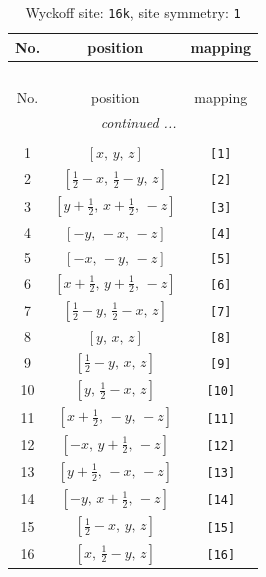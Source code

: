 \documentclass[fleqn,8pt]{jsarticle}
\begin{document}
\begin{longtable}{ccc}
\caption{Wyckoff site: {\tt 16k}, site symmetry: {\tt 1}}
 \\
 \hline \hline
No. & position & mapping \\ \hline \endfirsthead

\multicolumn{2}{l}{\tablename\ \thetable{}} \\
 \hline \hline
No. & position & mapping \\ \hline \endhead

 \hline \hline
\multicolumn{2}{r}{\footnotesize\it continued ...} \\ \endfoot

 \hline \hline
\multicolumn{2}{r}{} \\ \endlastfoot

1 & $\left[ x,\, y,\, z \right]$ & {\tt [1]} \\ \hline
2 & $\left[ \frac{1}{2} - x,\, \frac{1}{2} - y,\, z \right]$ & {\tt [2]} \\ \hline
3 & $\left[ y + \frac{1}{2},\, x + \frac{1}{2},\, - z \right]$ & {\tt [3]} \\ \hline
4 & $\left[ - y,\, - x,\, - z \right]$ & {\tt [4]} \\ \hline
5 & $\left[ - x,\, - y,\, - z \right]$ & {\tt [5]} \\ \hline
6 & $\left[ x + \frac{1}{2},\, y + \frac{1}{2},\, - z \right]$ & {\tt [6]} \\ \hline
7 & $\left[ \frac{1}{2} - y,\, \frac{1}{2} - x,\, z \right]$ & {\tt [7]} \\ \hline
8 & $\left[ y,\, x,\, z \right]$ & {\tt [8]} \\ \hline
9 & $\left[ \frac{1}{2} - y,\, x,\, z \right]$ & {\tt [9]} \\ \hline
10 & $\left[ y,\, \frac{1}{2} - x,\, z \right]$ & {\tt [10]} \\ \hline
11 & $\left[ x + \frac{1}{2},\, - y,\, - z \right]$ & {\tt [11]} \\ \hline
12 & $\left[ - x,\, y + \frac{1}{2},\, - z \right]$ & {\tt [12]} \\ \hline
13 & $\left[ y + \frac{1}{2},\, - x,\, - z \right]$ & {\tt [13]} \\ \hline
14 & $\left[ - y,\, x + \frac{1}{2},\, - z \right]$ & {\tt [14]} \\ \hline
15 & $\left[ \frac{1}{2} - x,\, y,\, z \right]$ & {\tt [15]} \\ \hline
16 & $\left[ x,\, \frac{1}{2} - y,\, z \right]$ & {\tt [16]} \\
\end{longtable}
\end{document}

